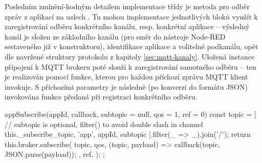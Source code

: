 Posledním zmínění-hodným detailem implementace třídy  je metoda pro odběr zpráv z aplikací na uzlech
.
Tu mohou implementace jednotlivých bloků využít k zaregistrování odběru konkrétního kanálu, resp. konkrétní aplikace
-- výsledný kanál je složen ze základního kanálu (pro směr do nástroje Node-RED sestaveného již v konstruktoru),
identifikace aplikace  a volitelně podkanálu, opět dle navržené struktury protokolu z kapitoly
\ref{sec:mqtt-kanaly}.
Uložená instance připojení k MQTT brokeru poté slouží k zaregistrování samotného odběru -- ten je realizován pomocí
funkce, kterou pro každou příchozí zprávu MQTT klient invokuje.
S příchozími parametry je následně (po konverzi do formátu JSON) invokována funkce předaná při registraci konkrétního
odběru.

\begin{code}[
    language=Javascript,
    label=code:fis-node-app-subscribe,
    caption={Detail z implementace třídy \ic{FisNode} -- metoda \ic{appSubscribe} je určená k zaregistrování odběru
    kanálu odpovídajícího konkrétní aplikaci na konkrétním uzlu.
    Parametr \ic{qos} slouží k nastavení konkrétní QoS pro tento odběr, \ic{ref} je poté volitelná identifikace odběru,
    lze pomocí ní poté mazat konkrétní odběry.}
]
appSubscribe(appId, callback, subtopic = null, qos = 1, ref = 0) {
    const topic = [
        // subtopic is optional, filter() to avoid double slash in channel
        this._subscribe_topic, 'app', appId, subtopic
    ].filter(_ => _).join('/');
    return this.broker.subscribe(
        topic,
        qos,
        (topic, payload) => {
            callback(topic, JSON.parse(payload));
        },
        ref,
    );
};
\end{code}

